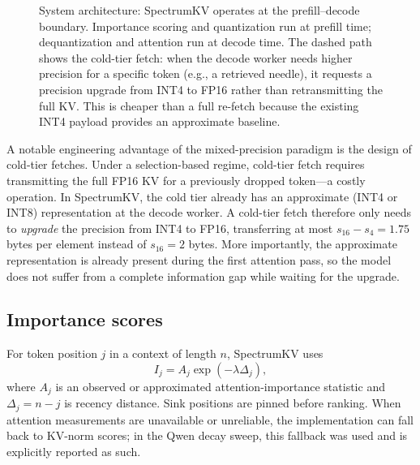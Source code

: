 \documentclass[11pt]{article}
\newcommand{\method}{SpectrumKV}
\theoremstyle{plain}
\theoremstyle{definition}
\begin{document}
\begin{figure}[t]
{%
}
\caption{System architecture: \method{} operates at the prefill--decode boundary.  Importance scoring and quantization run at prefill time; dequantization and attention run at decode time.  The dashed path shows the cold-tier fetch: when the decode worker needs higher precision for a specific token (e.g., a retrieved needle), it requests a precision upgrade from INT4 to FP16 rather than retransmitting the full KV.  This is cheaper than a full re-fetch because the existing INT4 payload provides an approximate baseline.}
\label{fig:sysarch}
\end{figure}

A notable engineering advantage of the mixed-precision paradigm is the design of cold-tier fetches.  Under a selection-based regime, cold-tier fetch requires transmitting the full FP16 KV for a previously dropped token---a costly operation.  In \method{}, the cold tier already has an approximate (INT4 or INT8) representation at the decode worker.  A cold-tier fetch therefore only needs to \emph{upgrade} the precision from INT4 to FP16, transferring at most $s_{16}-s_4 = 1.75$ bytes per element instead of $s_{16} = 2$ bytes.  More importantly, the approximate representation is already present during the first attention pass, so the model does not suffer from a complete information gap while waiting for the upgrade.

\subsection{Importance scores}
For token position $j$ in a context of length $n$, \method{} uses
\begin{equation}
  I_j = A_j \exp(-\lambda \Delta_j),
  \label{eq:importance}
\end{equation}
where $A_j$ is an observed or approximated attention-importance statistic and $\Delta_j=n-j$ is recency distance.  Sink positions are pinned before ranking.  When attention measurements are unavailable or unreliable, the implementation can fall back to KV-norm scores; in the Qwen decay sweep, this fallback was used and is explicitly reported as such.
\end{document}
